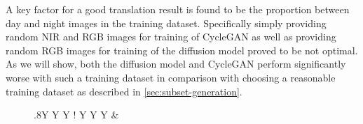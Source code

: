 \label{sec:time-dependent-sampling}
\label{sec:diffusion-vs-cyclegan-day}
A key factor for a good translation result is found to be the proportion between day and night images in the training dataset.
Specifically simply providing random NIR and RGB images for training of CycleGAN as well as providing random RGB images for training of the diffusion model proved to be not optimal.
As we will show, both the diffusion model and CycleGAN perform significantly worse with such a training dataset in comparison with choosing a reasonable training dataset as described in \autoref{sec:subset-generation}.

\begin{figure}[htp!]
    \centering
    \begin{tabularx}{.8\textwidth}{Y Y Y !{\hspace{.05\textwidth}} Y Y Y}
                                                                                         &                                                                                                                                                                                                                                                                                                                                                                                                                                                                        \\

\end{tabularx}
\end{figure}
